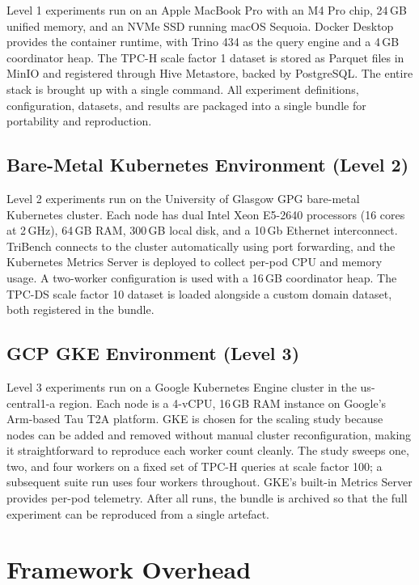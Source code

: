 \documentclass{l4proj}
\begin{document}
Level 1 experiments run on an Apple MacBook Pro with an M4 Pro chip, 24\,GB unified memory, and an NVMe SSD running macOS Sequoia. Docker Desktop provides the container runtime, with Trino 434 as the query engine and a 4\,GB coordinator heap. The TPC-H scale factor 1 dataset is stored as Parquet files in MinIO and registered through Hive Metastore, backed by PostgreSQL. The entire stack is brought up with a single command. All experiment definitions, configuration, datasets, and results are packaged into a single bundle for portability and reproduction.

\subsection{Bare-Metal Kubernetes Environment (Level 2)}
\label{sec:eval_gpg}

Level 2 experiments run on the University of Glasgow GPG bare-metal Kubernetes cluster. Each node has dual Intel Xeon E5-2640 processors (16 cores at 2\,GHz), 64\,GB RAM, 300\,GB local disk, and a 10\,Gb Ethernet interconnect. TriBench connects to the cluster automatically using port forwarding, and the Kubernetes Metrics Server is deployed to collect per-pod CPU and memory usage. A two-worker configuration is used with a 16\,GB coordinator heap. The TPC-DS scale factor 10 dataset is loaded alongside a custom domain dataset, both registered in the bundle.

\subsection{GCP GKE Environment (Level 3)}
\label{sec:eval_gke}

Level 3 experiments run on a Google Kubernetes Engine cluster in the us-central1-a region. Each node is a 4-vCPU, 16\,GB RAM instance on Google's Arm-based Tau T2A platform. GKE is chosen for the scaling study because nodes can be added and removed without manual cluster reconfiguration, making it straightforward to reproduce each worker count cleanly. The study sweeps one, two, and four workers on a fixed set of TPC-H queries at scale factor 100; a subsequent suite run uses four workers throughout. GKE's built-in Metrics Server provides per-pod telemetry. After all runs, the bundle is archived so that the full experiment can be reproduced from a single artefact.


\section{Framework Overhead}
\label{sec:eval_overhead}
\end{document}
